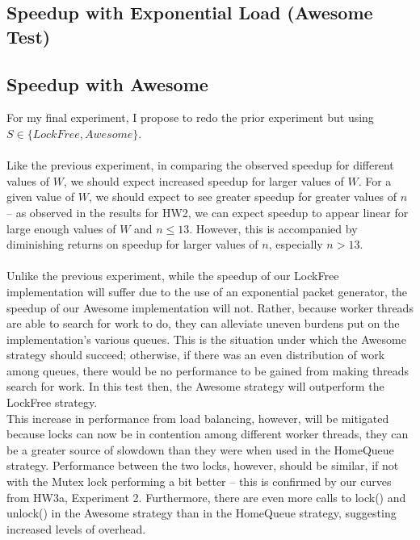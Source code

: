\documentclass[]{article}
\begin{document}
\subsection{Speedup with Exponential Load (Awesome Test)}
\subsection{Speedup with Awesome}
For my final experiment, I propose to redo the prior experiment but using $S \in \{LockFree, Awesome\}$.
\\\\
Like the previous experiment, in comparing the observed speedup for different values of $W$, we should expect increased speedup for larger values of $W$. For a given value of $W$, we should expect to see greater speedup for greater values of $n$ -- as observed in the results for HW2, we can expect speedup to appear linear for large enough values of $W$ and $n \leq 13$. However, this is accompanied by diminishing returns on speedup for larger values of $n$, especially $n > 13$.
\\\\
Unlike the previous experiment, while the speedup of our LockFree implementation will suffer due to the use of an exponential packet generator, the speedup of our Awesome implementation  will not. Rather, because worker threads are able to search for work to do, they can alleviate uneven burdens put on the implementation's various queues. This is the situation under which the Awesome strategy should succeed; otherwise, if there was an even distribution of work among queues, there would be no performance to be gained from making threads search for work. In this test then, the Awesome strategy will outperform the LockFree strategy.
\\
This increase in performance from load balancing, however, will be mitigated because locks can now be in contention among different worker threads, they can be a greater source of slowdown than they were when used in the HomeQueue strategy. Performance between the two locks, however, should be similar, if not with the Mutex lock performing a bit better -- this is confirmed by our curves from HW3a, Experiment 2. Furthermore, there are even more calls to lock() and unlock() in the Awesome strategy than in the HomeQueue strategy, suggesting increased levels of overhead. 

	
\end{document}
